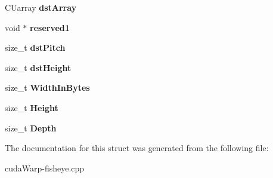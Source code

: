 \begin{DoxyCompactItemize}
\item 
C\+Uarray {\bfseries dst\+Array}\hypertarget{structCUDA__MEMCPY3D__st_ae95f7d57bfc7251b01de2fe32d3ea116}{}\label{structCUDA__MEMCPY3D__st_ae95f7d57bfc7251b01de2fe32d3ea116}

\item 
void $\ast$ {\bfseries reserved1}\hypertarget{structCUDA__MEMCPY3D__st_a9927846e2e05548f366343a1491d3858}{}\label{structCUDA__MEMCPY3D__st_a9927846e2e05548f366343a1491d3858}

\item 
size\+\_\+t {\bfseries dst\+Pitch}\hypertarget{structCUDA__MEMCPY3D__st_afdaa5cbe498302734f9fd44b80a04fba}{}\label{structCUDA__MEMCPY3D__st_afdaa5cbe498302734f9fd44b80a04fba}

\item 
size\+\_\+t {\bfseries dst\+Height}\hypertarget{structCUDA__MEMCPY3D__st_ab3257d87b2a20782cc2c6ea323d4688d}{}\label{structCUDA__MEMCPY3D__st_ab3257d87b2a20782cc2c6ea323d4688d}

\item 
size\+\_\+t {\bfseries Width\+In\+Bytes}\hypertarget{structCUDA__MEMCPY3D__st_a3f3b53b0597c5afc13c9a3147271ca30}{}\label{structCUDA__MEMCPY3D__st_a3f3b53b0597c5afc13c9a3147271ca30}

\item 
size\+\_\+t {\bfseries Height}\hypertarget{structCUDA__MEMCPY3D__st_a5c4eff50c50d4e457ff51f137c1a7c69}{}\label{structCUDA__MEMCPY3D__st_a5c4eff50c50d4e457ff51f137c1a7c69}

\item 
size\+\_\+t {\bfseries Depth}\hypertarget{structCUDA__MEMCPY3D__st_a2adc0e58f9dd5f26f8e12b570ff41fe2}{}\label{structCUDA__MEMCPY3D__st_a2adc0e58f9dd5f26f8e12b570ff41fe2}

\end{DoxyCompactItemize}


The documentation for this struct was generated from the following file\+:\begin{DoxyCompactItemize}
\item 
cuda\+Warp-\/fisheye.\+cpp\end{DoxyCompactItemize}
